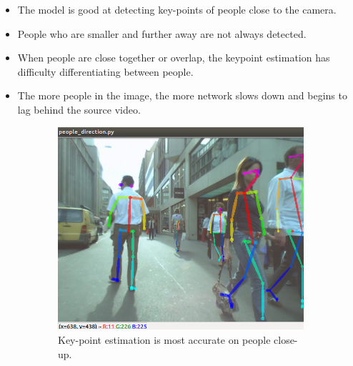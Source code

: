 \begin{itemize}
    \item The model is good at detecting key-points of people close to the camera.
    \item People who are smaller and further away are not always detected.
    \item When people are close together or overlap, the keypoint estimation has difficulty differentiating between people.
    \item The more people in the image, the more network slows down and begins to lag behind the source video.
\end{itemize}

\begin{figure}[ht]
    \begin{subfigure}[b]{.32\textwidth}
        \centering
        \includegraphics[width=1.0\linewidth]{img/chapter5_implementation/openposeKP.png}
        \caption{Key-point estimation is most accurate on people close-up.}
    \end{subfigure}%
    \hspace{\fill} 
    \begin{subfigure}[b]{.32\textwidth}
        \centering

\end{subfigure}
\end{figure}
